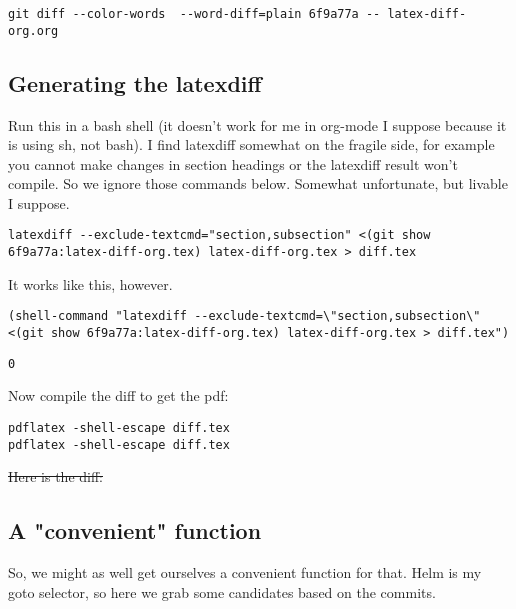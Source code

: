 \documentclass[11pt]{article}
\providecommand{\DIFdel}[1]{{\protect\color{red}\sout{#1}}}                      %
\providecommand{\DIFaddbegin}{} %
\providecommand{\DIFaddend}{} %
\providecommand{\DIFdelbegin}{} %
\providecommand{\DIFdelend}{} %
\begin{document}
\begin{verbatim}
git diff --color-words  --word-diff=plain 6f9a77a -- latex-diff-org.org
\end{verbatim}

\subsection{Generating the latexdiff}
\label{sec-1-2}

Run this in a bash shell (it doesn't work for me in org-mode I suppose because it is using sh, not bash). I find latexdiff somewhat on the fragile side, for example you cannot make changes in section headings or the latexdiff result won't compile. So we ignore those commands below. Somewhat unfortunate, but livable I suppose.

\begin{verbatim}
latexdiff --exclude-textcmd="section,subsection" <(git show 6f9a77a:latex-diff-org.tex) latex-diff-org.tex > diff.tex
\end{verbatim}

It works like this, however.
\begin{verbatim}
(shell-command "latexdiff --exclude-textcmd=\"section,subsection\" <(git show 6f9a77a:latex-diff-org.tex) latex-diff-org.tex > diff.tex")
\end{verbatim}

\begin{verbatim}
0
\end{verbatim}

Now compile the diff to get the pdf:

\begin{verbatim}
pdflatex -shell-escape diff.tex
pdflatex -shell-escape diff.tex
\end{verbatim}


\DIFdelbegin \DIFdel{Here is the diff: }%

\DIFdelend \DIFaddbegin \subsection{A "convenient" function}
\label{sec-1-3}
\DIFaddend So, we might as well get ourselves a convenient function for that. Helm is my goto selector, so here we grab some candidates based on the commits.
\end{document}
